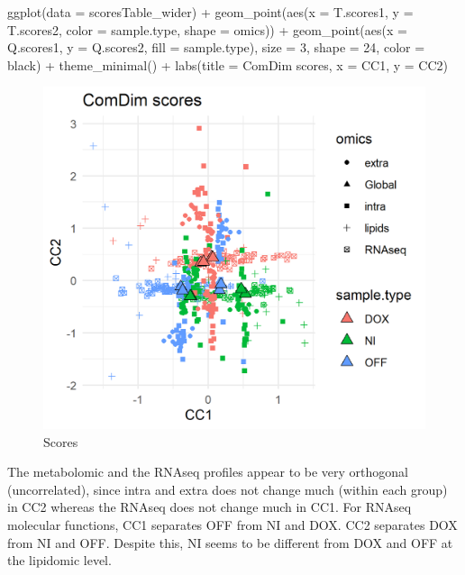 \documentclass[
]{book}
\newenvironment{Shaded}{\begin{snugshade}}{\end{snugshade}}
\newcommand{\AttributeTok}[1]{\textcolor[rgb]{0.77,0.63,0.00}{#1}}
\newcommand{\DecValTok}[1]{\textcolor[rgb]{0.00,0.00,0.81}{#1}}
\newcommand{\FunctionTok}[1]{\textcolor[rgb]{0.00,0.00,0.00}{#1}}
\newcommand{\NormalTok}[1]{#1}
\newcommand{\SpecialCharTok}[1]{\textcolor[rgb]{0.00,0.00,0.00}{#1}}
\newcommand{\StringTok}[1]{\textcolor[rgb]{0.31,0.60,0.02}{#1}}
\begin{document}
\begin{Shaded}
\begin{Highlighting}[]
  \FunctionTok{ggplot}\NormalTok{(}\AttributeTok{data =}\NormalTok{ scoresTable\_wider) }\SpecialCharTok{+}
    \FunctionTok{geom\_point}\NormalTok{(}\FunctionTok{aes}\NormalTok{(}\AttributeTok{x =}\NormalTok{ T.scores1, }\AttributeTok{y =}\NormalTok{ T.scores2, }\AttributeTok{color =}\NormalTok{ sample.type, }\AttributeTok{shape =}\NormalTok{ omics)) }\SpecialCharTok{+}
    \FunctionTok{geom\_point}\NormalTok{(}\FunctionTok{aes}\NormalTok{(}\AttributeTok{x =}\NormalTok{ Q.scores1, }\AttributeTok{y =}\NormalTok{ Q.scores2, }\AttributeTok{fill =}\NormalTok{ sample.type),}
               \AttributeTok{size =} \DecValTok{3}\NormalTok{, }\AttributeTok{shape =} \DecValTok{24}\NormalTok{, }\AttributeTok{color =} \StringTok{\textquotesingle{}black\textquotesingle{}}\NormalTok{) }\SpecialCharTok{+}
    \FunctionTok{theme\_minimal}\NormalTok{() }\SpecialCharTok{+}
    \FunctionTok{labs}\NormalTok{(}\AttributeTok{title =} \StringTok{\textquotesingle{}ComDim scores\textquotesingle{}}\NormalTok{, }\AttributeTok{x =} \StringTok{\textquotesingle{}CC1\textquotesingle{}}\NormalTok{, }\AttributeTok{y =} \StringTok{\textquotesingle{}CC2\textquotesingle{}}\NormalTok{)}
\end{Highlighting}
\end{Shaded}

\begin{figure}

{\centering \includegraphics[width=0.5\linewidth]{Figs/fig5_1} 

}

\caption{Scores}\label{fig:unnamed-chunk-12}
\end{figure}

The metabolomic and the RNAseq profiles appear to be very orthogonal
(uncorrelated), since intra and extra does not change much (within each group)
in CC2 whereas the RNAseq does not change much in CC1.
For RNAseq molecular functions, CC1 separates OFF from NI and DOX.
CC2 separates DOX from NI and OFF.
Despite this, NI seems to be different from DOX and OFF at the lipidomic level.
\end{document}
